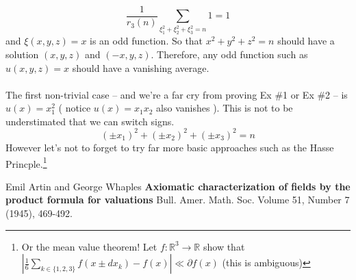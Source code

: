 \documentclass[12pt]{article}
\begin{document}
$$  \frac{1}{r_3(n)} \sum_{\xi_1^2 + \xi_2^2 + \xi_3^2 = n} 1 = 1  $$
and $\xi(x,y,z) = x$ is an odd function.  So that $x^2 + y^2 + z^2 = n$ should have a solution $(x,y,z)$ and $(-x,y,z)$.  Therefore, any odd function such as $u(x,y,z) = x$ should have a vanishing average.  \\ \\
The first non-trivial case -- and we're a far cry from proving Ex \#1 or Ex \#2 -- is $u(x) = x_1^2$ ( notice $u(x) = x_1 x_2$ also vanishes ).  This is not to be understimated that we can switch signs.
$$ (\pm x_1)^2 + (\pm x_2)^2 + (\pm x_3)^2 = n $$
However let's not to forget to try far more basic approaches such as the Hasse Princple.\footnote{Or the mean value theorem! Let $f: \mathbb{R}^3 \to \mathbb{R}$ show that $|\frac{1}{6}\sum_{k \in \{1,2,3\}} f(x \pm dx_k) - f(x)|\ll \partial f (x)$ (this is ambiguous)}

\newpage


\begin{thebibliography}{}

\item Emil Artin and George Whaples \textbf{Axiomatic characterization of fields by the product formula for valuations} Bull. Amer. Math. Soc.
Volume 51, Number 7 (1945), 469-492.




\end{thebibliography}
\end{document}
